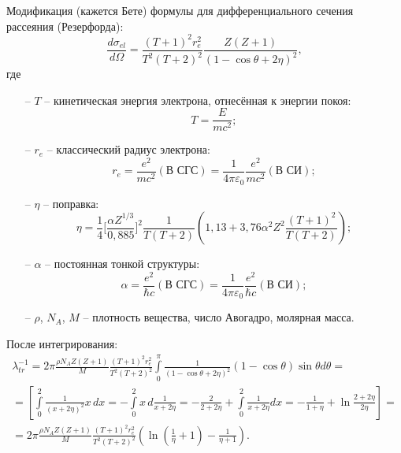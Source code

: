 \documentclass[a4paper,12pt]{article} %
\newcommand{\Dff}[2]{\frac{d #1}{d #2}}
\newcommand{\eps}{\varepsilon}
\begin{document}
Модификация (кажется Бете) формулы для дифференциального сечения рассеяния (Резерфорда):
\begin{equation}
    \Dff{\sigma_{el}}{\Omega} =
    \frac{(T+1)^2 r_e^2}{T^2(T+2)^2} \frac{Z(Z+1)}{(1 - \cos \theta + 2 \eta)^2},
\end{equation}
где
\begin{itemize}
    \item[--] $T$ -- кинетическая энергия электрона, отнесённая к энергии покоя:
    \begin{equation}
        T = \frac{E}{mc^2};
    \end{equation}
    \item[--] $r_e$ -- классический радиус электрона:
    \begin{equation}
        r_e = \frac{e^2}{mc^2} (\text{В СГС}) = \frac{1}{4 \pi \eps_0}\frac{e^2}{mc^2} (\text{В СИ});
    \end{equation}
    \item[--] $\eta$ -- поправка:
    \begin{equation}
        \eta = \frac{1}{4}
        \Big[
            \frac{\alpha Z^{1/3}}{0{,}885}
        \Big]^2
        \frac{1}{T(T+2)} \left(1{,}13 + 3{,}76 \alpha^2 Z^2 \frac{(T+1)^2}{T(T+2)} \right);
    \end{equation}
    \item[--] $\alpha$ -- постоянная тонкой структуры:
    \begin{equation}
        \alpha = \frac{e^2}{\hbar c} (\text{В СГС}) = \frac{1}{4 \pi \eps_0} \frac{e^2}{\hbar c} (\text{В СИ});
    \end{equation}
    \item[--] $\rho$, $N_A$, $M$ -- плотность вещества, число Авогадро, молярная масса.
\end{itemize}

После интегрирования:
\begin{equation}
    \begin{gathered}
        \lambda_{tr}^{-1} =
        2 \pi \frac{\rho N_AZ(Z+1)}{M}
        \frac{(T+1)^2 r_e^2}{T^2(T+2)^2}
        \int\limits_{0}^{\pi}
        \frac{1}{(1 - \cos \theta + 2 \eta)^2} (1 - \cos \theta) \sin \theta d \theta
        = \\ =
        \left[
            \int\limits_{0}^{2} \frac{1}{(x + 2 \eta)^2} x\, dx =
            - \int\limits_{0}^{2}  x\, d\frac{1}{x + 2 \eta} =
            -\frac{2}{2 + 2 \eta} + \int\limits_{0}^{2} \frac{1}{x + 2 \eta} dx =
            -\frac{1}{1 + \eta} + \ln \frac{2 +  2 \eta}{2 \eta}
        \right]
        = \\ =
        2 \pi \frac{\rho N_AZ(Z+1)}{M}
        \frac{(T+1)^2 r_e^2}{T^2(T+2)^2}
        \left(
            \ln \left( \frac{1}{\eta} + 1 \right) - \frac{1}{\eta + 1}
        \right).
    \end{gathered}
\end{equation}
\end{document}
